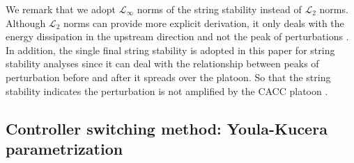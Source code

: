 \documentclass[journal]{IEEEtran}
\begin{document}
We remark that we adopt $\mathcal{L}_{\infty}$ norms of the string stability instead of $\mathcal{L}_{2}$ norms. Although $\mathcal{L}_{2}$ norms can provide more explicit derivation, it only deals with the energy dissipation in the upstream direction and not the peak of perturbations \citep{Darbha2003}. In addition, the single final string stability is adopted in this paper for string stability analyses since it can deal with the relationship between peaks of perturbation before and after it spreads over the platoon. So that the string stability indicates the perturbation is not amplified by the CACC platoon \citep{Studli2017}.



\subsection{Controller switching method: Youla-Kucera parametrization}
\label{Section 3.2}
\end{document}
